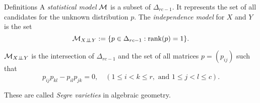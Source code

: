 \begin{frame}

    \begin{block}{Definitions}
        A \emph{statistical model} $\mathcal{M}$ is a subset of $\Delta_{rc-1}$. It represents the set of all candidates for the unknown distribution $p$.
        \vspace*{12pt}
        The \emph{independence model} for $X$ and $Y$ is the set
        $$ \mathcal{M}_{X \perp \!\!\! \perp Y} := \{ p \in \Delta_{rc - 1} : \rank(p) = 1 \}. $$
    \end{block}

    $\mathcal{M}_{X \perp \!\!\! \perp Y}$ is the intersection of $\Delta_{rc-1}$ and the set of all matrices $p = (p_{ij})$ such that
    $$ p_{ij}p_{kl} - p_{il}p_{jk} = 0, \quad (1 \leq i < k \leq r, \text{ and } 1 \leq j < l \leq c). $$

    These are called \emph{Segre varieties} in algebraic geometry.

\end{frame}
